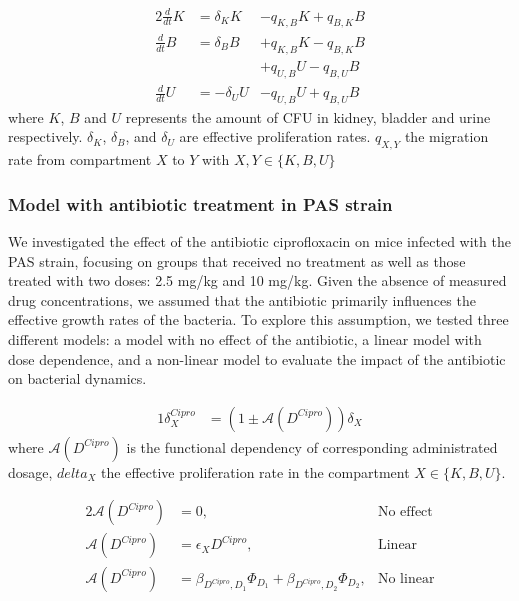 \documentclass{article}
\begin{document}
\begin{alignat}{2}
\frac{d}{dt} K &=  \delta_K K &- q_{K,B} K + q_{B,K} B \nonumber \\
\frac{d}{dt} B &=  \delta_B B &+ q_{K,B} K - q_{B,K} B \nonumber \\
&              &+ q_{U,B} U - q_{B,U} B \nonumber \\
\frac{d}{dt} U &= -\delta_U U &- q_{U,B} U + q_{B,U} B \label{eq:ODEeffect}
\end{alignat}
where $K$, $B$ and $U$ represents the amount of CFU in kidney, bladder and urine respectively. 
$\delta_K$, $\delta_B$, and $\delta_U$ are effective proliferation rates.  $q_{X,Y}$ the migration rate from compartment $X$ to $Y$ with $X, Y \in \{K,B,U\}$

\subsubsection{Model with antibiotic treatment in PAS strain}

We investigated the effect of the antibiotic ciprofloxacin on mice infected with the PAS strain, focusing on groups that received no treatment as well as those treated with two doses: 2.5 mg/kg and 10 mg/kg. Given the absence of measured drug concentrations, we assumed that the antibiotic primarily influences the effective growth rates of the bacteria. To explore this assumption, we tested three different models: a model with no effect of the antibiotic, a linear model with dose dependence, and a non-linear model to evaluate the impact of the antibiotic on bacterial dynamics.

\begin{alignat}{1}
\delta_{X}^{Cipro} &= \left( 1 \pm \mathcal{A}(D^{Cipro} ) \right) \delta_{X}
\end{alignat}
where $\mathcal{A}(D^{Cipro} )$ is the functional dependency of corresponding administrated dosage, $delta_X$ the effective proliferation rate in the compartment $X \in \{K, B, U\}$.


\begin{alignat}{2}
	\mathcal{A}(D^{Cipro}) &= 0, & \text{No effect} \\
	\mathcal{A}(D^{Cipro}) &= \epsilon_{X} D^{Cipro}, & \text{Linear} \\
	\mathcal{A}(D^{Cipro}) &= \beta_{D^{Cipro}, D_1}\Phi_{D_1} + \beta_{D^{Cipro}, D_2}\Phi_{D_2}, & \text{No linear}
\end{alignat}
\end{document}
